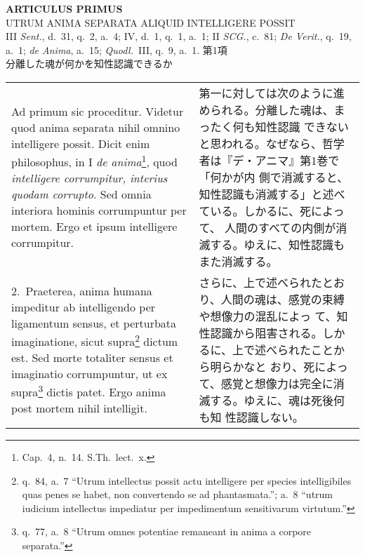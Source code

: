 \documentclass[10pt]{jsarticle} %
\begin{document}
\newpage
{}

\begin{center}
{\bf \Large ARTICULUS PRIMUS}\\
{\large UTRUM ANIMA SEPARATA ALIQUID INTELLIGERE POSSIT}\\
{\footnotesize III {\it Sent.}, d.~31, q.~2, a.~4; IV, d.~1, q.~1, a.~1; II
 {\it SCG.},
 c.~81; {\it De Verit.}, q.~19, a.~1; {\it de Anima}, a.~15; {\it Quodl.}~III, q.~9,
 a.~1.}
{\Large 第1項\\分離した魂が何かを知性認識できるか}

\end{center}

\begin{longtable}{p{21em}p{21em}}

{\huge A}{\sc d primum sic proceditur}. Videtur quod anima separata nihil omnino
 intelligere possit. Dicit enim philosophus, in I {\it de
 anima}\footnote{Cap.~4, n.~14. S.Th.~lect.~x.}, quod
 {\it intelligere corrumpitur, interius quodam corrupto}. Sed omnia interiora
 hominis corrumpuntur per mortem. Ergo et ipsum intelligere corrumpitur.

&

第一に対しては次のように進められる。分離した魂は、まったく何も知性認識
できないと思われる。なぜなら、哲学者は『デ・アニマ』第1巻で「何かが内
側で消滅すると、知性認識も消滅する」と述べている。しかるに、死によって、
人間のすべての内側が消滅する。ゆえに、知性認識もまた消滅する。


\\

2.~{\sc Praeterea}, anima humana impeditur ab intelligendo per
ligamentum
sensus, et perturbata imaginatione, sicut supra\footnote{q.~84, a.~7
``Utrum intellectus possit actu intelligere per species intelligibiles
quas penes se habet, non convertendo se ad phantasmata.''; a.~8
``utrum iudicium intellectus impediatur per impedimentum sensitivarum
virtutum.''} dictum est. Sed morte totaliter sensus et imaginatio
corrumpuntur, ut ex supra\footnote{q.~77, a.~8 ``Utrum omnes potentiae
remaneant in anima a corpore separata.''} dictis patet. Ergo anima
post mortem nihil intelligit.

&

さらに、上で述べられたとおり、人間の魂は、感覚の束縛や想像力の混乱によっ
て、知性認識から阻害される。しかるに、上で述べられたことから明らかなと
おり、死によって、感覚と想像力は完全に消滅する。ゆえに、魂は死後何も知
性認識しない。



\end{longtable}
\end{document}
